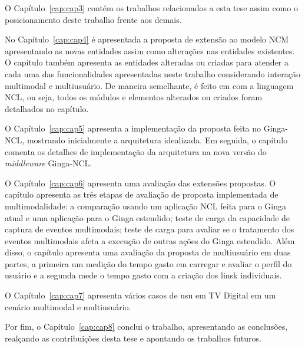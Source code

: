 O Capítulo~\ref{cap:cap3} contém os trabalhos relacionados a esta tese assim como o posicionamento deste trabalho frente aos demais.

No Capítulo~\ref{cap:cap4} é apresentada a proposta de extensão ao modelo NCM apresentando as novas entidades assim como alterações nas entidades existentes. O capítulo também apresenta as entidades alteradas ou criadas para atender a cada uma das funcionalidades apresentadas neste trabalho considerando interação multimodal e multiusuário. De maneira semelhante, é feito em com a linguagem NCL, ou seja, todos os módulos e elementos alterados ou criados foram detalhados no capítulo. 

O Capítulo~\ref{cap:cap5} apresenta a implementação da proposta feita no Ginga-NCL, mostrando inicialmente a arquitetura idealizada. Em seguida, o capítulo comenta os detalhes de implementação da arquitetura na nova versão do \textit{middleware} Ginga-NCL. 

O Capítulo~\ref{cap:cap6} apresenta uma avaliação das extensões propostas. O capítulo apresenta as três etapas de avaliação de proposta implementada de multimodalidade: a comparação usando um aplicação NCL feita para o Ginga atual e uma aplicação para o Ginga estendido; teste de carga da capacidade de captura de eventos multimodais; teste de carga para avaliar se o tratamento dos eventos multimodais afeta a execução de outras ações do Ginga estendido. Além disso, o capítulo apresenta uma avaliação da proposta de multiusuário em duas partes, a primeira um medição do tempo gasto em carregar e avaliar o perfil do usuário e a segunda mede o tempo gasto com a criação dos linsk individuais.

O Capítulo~\ref{cap:cap7} apresenta vários casos de usu em TV Digital em um cenário multimodal e multiusuário.

Por fim, o Capítulo~\ref{cap:cap8} conclui o trabalho, apresentando as conclusões, realçando as contribuições desta tese e apontando os  trabalhos futuros.